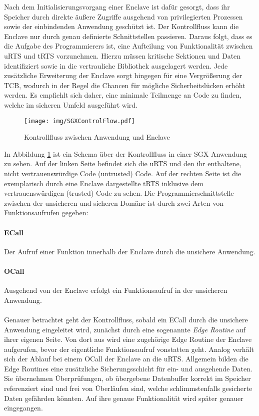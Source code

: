 Nach dem Initialisierungsvorgang einer Enclave ist dafür gesorgt, dass ihr Speicher durch direkte äußere Zugriffe ausgehend von privilegierten Prozessen sowie der einbindenden Anwendung geschützt ist. Der Kontrollfluss kann die Enclave nur durch genau definierte Schnittstellen passieren. Daraus folgt, dass es die Aufgabe des Programmierers ist, eine Aufteilung von Funktionalität zwischen \ac{uRTS} und \ac{tRTS} vorzunehmen. Hierzu müssen kritische Sektionen und Daten identifiziert sowie in die vertrauliche Bibliothek ausgelagert werden. Jede zusätzliche Erweiterung der Enclave sorgt hingegen für eine Vergrößerung der \ac{TCB}, wodurch in der Regel die Chancen für mögliche Sicherheitslücken erhöht werden. Es empfiehlt sich daher, eine minimale Teilmenge an Code zu finden, welche im sicheren Umfeld ausgeführt wird.

\begin{figure}
	\texttt{[image: img/SGXControlFlow.pdf]}
	\centering
	\caption{Kontrollfluss zwischen Anwendung und Enclave}
	\label{fig:sgxcontrolflow}
\end{figure}

In Abbildung \ref{fig:sgxcontrolflow} ist ein Schema über der Kontrollfluss in einer SGX Anwendung zu sehen. Auf der linken Seite befindet sich die uRTS und den ihr enthaltene, nicht vertrauenswürdige Code (untrusted) Code. Auf der rechten Seite ist die exemplarisch durch eine Enclave dargestellte tRTS inklusive dem vertrauenswürdigen (trusted) Code zu sehen. Die Programmierschnittstelle zwischen der unsicheren und sicheren Domäne ist durch zwei Arten von Funktionsaufrufen gegeben:

\paragraph{\ac{ECall}} Der Aufruf einer Funktion innerhalb der Enclave durch die unsichere Anwendung.

\paragraph{\ac{OCall}} Ausgehend von der Enclave erfolgt ein Funktionsaufruf in der unsicheren Anwendung.

\paragraph{} 
Genauer betrachtet geht der Kontrollfluss, sobald ein \ac{ECall} durch die unsichere Anwendung eingeleitet wird, zunächst durch eine sogenannte \textit{Edge Routine} auf ihrer eigenen Seite. Von dort aus wird eine zugehörige Edge Routine der Enclave aufgerufen, bevor der eigentliche Funktionsaufruf vonstatten geht. Analog verhält sich der Ablauf bei einem \ac{OCall} der Enclave an die uRTS. Allgemein bilden die Edge Routines eine zusätzliche Sicherungsschicht für ein- und ausgehende Daten. Sie übernehmen Überprüfungen, ob übergebene Datenbuffer korrekt im Speicher referenziert sind und frei von Überläufen sind, welche schlimmstenfalls gesicherte Daten gefährden könnten. Auf ihre genaue Funktionalität wird später genauer eingegangen.

